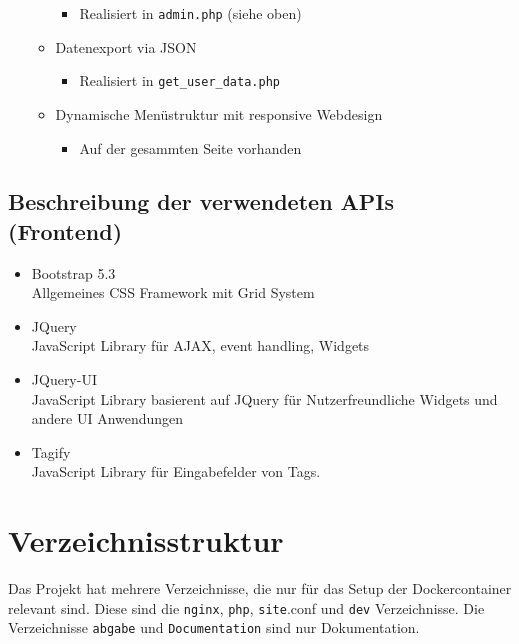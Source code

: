 \documentclass{article}
\begin{document}
\begin{itemize}
\begin{itemize}
\begin{itemize}
                \item Realisiert in \verb|admin.php| (siehe oben)
            \end{itemize}
        \item Datenexport via JSON
            \begin{itemize}
                \item Realisiert in \verb|get_user_data.php|
            \end{itemize}
        \item Dynamische Menüstruktur mit responsive Webdesign
            \begin{itemize}
                \item Auf der gesammten Seite vorhanden
            \end{itemize}
    \end{itemize}
\end{itemize}

\subsection{Beschreibung der verwendeten APIs (Frontend)}
\begin{itemize}
    \item Bootstrap 5.3\\
        Allgemeines CSS Framework mit Grid System
    \item JQuery\\
        JavaScript Library für AJAX, event handling, Widgets
    \item JQuery-UI\\
        JavaScript Library basierent auf JQuery für Nutzerfreundliche Widgets und andere
        UI Anwendungen
    \item Tagify\\
        JavaScript Library für Eingabefelder von Tags.
\end{itemize}
\label{tab:my_label}

\pagebreak
\section{Verzeichnisstruktur}
Das Projekt hat mehrere Verzeichnisse, die nur für das Setup der Dockercontainer relevant sind. 
Diese sind die \verb|nginx|, \verb|php|, \verb|site|.conf und \verb|dev| Verzeichnisse. 
Die Verzeichnisse \verb|abgabe| und \verb|Documentation| sind nur Dokumentation.
\end{document}
